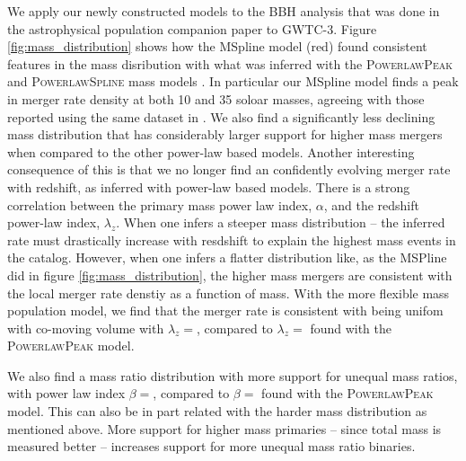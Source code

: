 
We apply our newly constructed models to the BBH analysis that was done in the astrophysical population companion paper to GWTC-3. 
Figure \ref{fig:mass_distribution} shows how the MSpline model (red) found consistent features in the mass disribution with 
what was inferred with the \textsc{PowerlawPeak} and \textsc{PowerlawSpline} mass models \cite{Talbot_2019,o3a_pop,Edelman_2022ApJ,o3b_astro_dist}. 
In particular our MSpline model finds a peak in merger rate density at both 10 and 35 soloar masses, agreeing with those reported using the same dataset in \citet{o3b_astro_dist}. 
We also find a significantly less declining mass distribution that has considerably larger support for higher mass mergers when 
compared to the other power-law based models. Another interesting consequence of this is that we no longer find an confidently
evolving merger rate with redshift, as inferred with power-law based models. There is a strong correlation between the primary mass 
power law index, $\alpha$, and the redshift power-law index, $\lambda_z$. When one infers a steeper mass distribution -- the inferred 
rate must drastically increase with resdshift to explain the highest mass events in the catalog. However, when one infers a 
flatter distribution like, as the MSPline did in figure \ref{fig:mass_distribution}, the higher mass mergers are consistent with 
the local merger rate denstiy as a function of mass. With the more flexible mass population model, we find that the merger rate 
is consistent with being unifom with co-moving volume with $\lambda_z = $\result{$\CIPlusMinus{\macros[MSplineIIDCompSpins][lamb]}$}, compared 
to $\lambda_z = $\result{$\CIPlusMinus{\macros[PLPeak][lamb]}$} found with the \textsc{PowerlawPeak} model.

We also find a mass ratio distribution with more support for unequal mass ratios, with power law index 
$\beta = $\result{$\CIPlusMinus{\macros[MSplineIIDCompSpins][beta]}$}, compared to $\beta = $\result{$\CIPlusMinus{\macros[PLPeak][beta]}$} 
found with the \textsc{PowerlawPeak} model. This can also be in part related with the harder mass distribution 
as mentioned above. More support for higher mass primaries  -- since total mass is measured better -- increases support for more unequal 
mass ratio binaries. 

